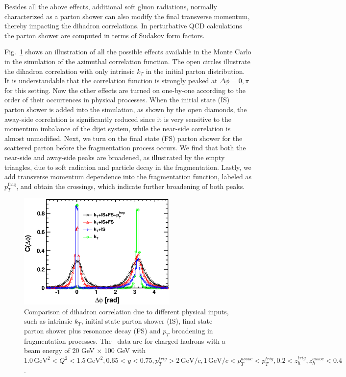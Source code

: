 Besides all the above effects, additional soft gluon radiations, normally 
characterized as a parton shower can also modify the final transverse
momentum, thereby impacting the dihadron correlations. In perturbative QCD
calculations the parton shower are computed in terms of Sudakov
form factors.

Fig.~\ref{fig:dihadron_effects} shows an illustration of all the possible
effects available in the Monte Carlo in the simulation of the azimuthal correlation
function. The open circles illustrate the dihadron correlation with only
intrinsic $k_T$ in the initial parton distribution. It is understandable that the
correlation function is strongly peaked at $\Delta \phi =0, \pi$ for this setting.
Now the other effects are turned on one-by-one according to the order of their
occurrences in physical processes. When the initial state (IS) parton shower
is added into the simulation, as shown by the open diamonds, the away-side
correlation is significantly reduced since it is very sensitive to the momentum
imbalance of the dijet system, while the near-side correlation is almost
unmodified. Next, we turn on the final state (FS) parton shower for the scattered 
parton before the fragmentation process occurs. We find that both the
near-side and away-side peaks are broadened, as illustrated by the empty triangles,
due to soft radiation and particle decay in the fragmentation. 
Lastly, we add transverse momentum dependence into the fragmentation 
function, labeled as $p_T^{\textrm{frag}}$, and obtain the crossings, which indicate further broadening of both peaks.

\begin{figure}
\begin{center}
\includegraphics[width=0.7\textwidth]
{plots/chpt6/deltaPhi_20x100_Q2_1_y_0.7_Effects_decay.eps}
\end{center} 
\caption[effects in Monte Carlo on azimuthal diahdron correlation]
{
Comparison of dihadron correlation due to different physical inputs, such as 
intrinsic $k_T$, initial state parton shower (IS), final state parton shower plus 
resonance decay (FS) and $p_T$ broadening in fragmentation processes.
The \ep\ data are for charged hadrons with a beam energy of 20 GeV $\times$ 100 GeV 
with $1.0 \, \mathrm{GeV}^{2}  < Q^{2} < 1.5 \, \textrm{GeV}^2, 0.65 < y < 0.75, p_{T}^{trig} > 2 \,
\mathrm{GeV/}c, 1 \, \mathrm{GeV/}c < p_{T}^{assoc} < p_{T}^{trig}, 0.2 <
z_{h}^{trig}, z_{h}^{assoc} < 0.4$. 
}
\label{fig:dihadron_effects}
\end{figure}

